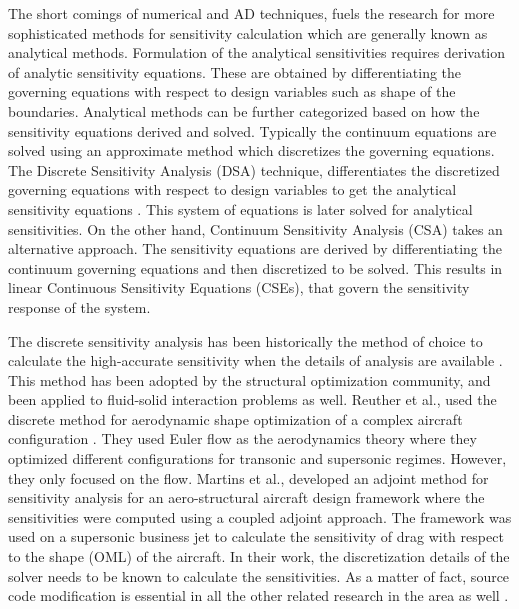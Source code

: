 The short comings of numerical and AD techniques, fuels the research for more sophisticated methods for sensitivity calculation which are generally known as analytical methods. Formulation of the analytical sensitivities requires derivation of analytic sensitivity equations. These are obtained by differentiating the governing equations with respect to design variables such as shape of the boundaries. Analytical methods can be further categorized based on how the sensitivity equations derived and solved. Typically the continuum equations are solved using an approximate method which discretizes the governing equations. The Discrete Sensitivity Analysis (DSA) technique, differentiates the discretized governing equations with respect to design variables to get the analytical sensitivity equations \cite{choi2006structural}. This system of equations is later solved for analytical sensitivities. On the other hand, Continuum Sensitivity Analysis (CSA) takes an alternative approach. The sensitivity equations are derived by differentiating the continuum governing equations and then discretized to be solved. This results in linear Continuous Sensitivity Equations (CSEs), that govern the sensitivity response of the system.

The discrete sensitivity analysis has been historically the method of choice to calculate the high-accurate sensitivity when the details of analysis are available \cite{arora1979methods}. This method has been adopted by the structural optimization community, and been applied to fluid-solid interaction problems as well. Reuther et al., used the discrete method for aerodynamic shape optimization of a complex aircraft configuration \cite{reuther1999constrained}. They used Euler flow as the aerodynamics theory where they optimized different configurations for transonic and supersonic regimes. However, they only focused on the flow. Martins et al., developed an adjoint method for sensitivity analysis for an aero-structural aircraft design framework where the sensitivities were computed using a coupled adjoint approach. The framework was used on a supersonic business jet to calculate the sensitivity of drag with respect to the shape (OML) of the aircraft. In their work, the discretization details of the solver needs to be known to calculate the sensitivities. As a matter of fact, source code modification is essential in all the other related research in the area as well \cite{gamboa2009optimization, pandya1997gradient, kim2001aerodynamic}.

